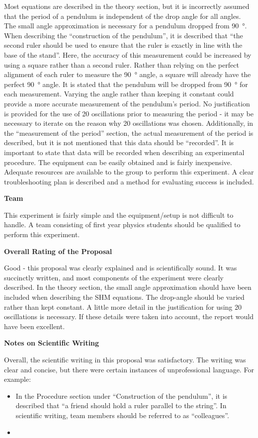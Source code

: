 Most equations are described in the theory section, but it is incorrectly assumed that the period of a pendulum is independent of the drop angle for all angles. The small angle approximation is necessary for a pendulum dropped from \SI{90}{\degree}. When describing the ``construction of the pendulum'', it is described that ``the second ruler should be used to ensure that the ruler is exactly in line with the base of the stand''. Here, the accuracy of this measurement could be increased by using a square rather than a second ruler. Rather than relying on the perfect alignment of each ruler to measure the \SI{90}{\degree} angle, a square will already have the perfect \SI{90}{\degree} angle. It is stated that the pendulum will be dropped from \SI{90}{\degree} for each measurement. Varying the angle rather than keeping it constant could provide a more accurate measurement of the pendulum's period. No justification is provided for the use of 20 oscillations prior to measuring the period - it may be necessary to iterate on the reason why 20 oscillations was chosen. Additionally, in the ``measurement of the period'' section, the actual measurement of the period is described, but it is not mentioned that this data should be ``recorded''. It is important to state that data will be recorded when describing an experimental procedure. The equipment can be easily obtained and is fairly inexpensive. Adequate resources are available to the group to perform this experiment. A clear troubleshooting plan is described and a method for evaluating success is included. 

\textbf{Team}

This experiment is fairly simple and the equipment/setup is not difficult to handle. A team consisting of first year physics students should be qualified to perform this experiment.

\textbf{Overall Rating of the Proposal}

Good - this proposal was clearly explained and is scientifically sound. It was succinctly written, and most components of the experiment were clearly described. In the theory section, the small angle approximation should have been included when describing the SHM equations. The drop-angle should be varied rather than kept constant. A little more detail in the justification for using 20 oscillations is necessary. If these details were taken into account, the report would have been excellent.

\textbf{Notes on Scientific Writing}

Overall, the scientific writing in this proposal was satisfactory. The writing was clear and concise, but there were certain instances of unprofessional language. For example:
\begin{itemize}
\item In the Procedure section under ``Construction of the pendulum'', it is described that ``a friend should hold a ruler parallel to the string''. In scientific writing, team members should be referred to as ``colleagues''.
\item 
\end{itemize}

